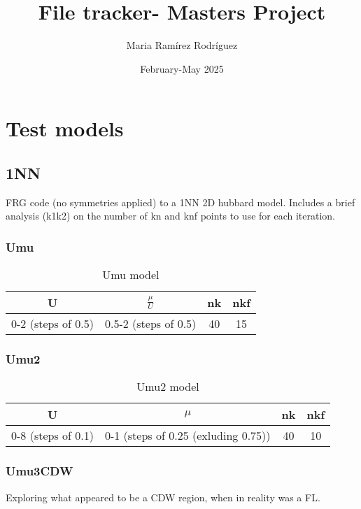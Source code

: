 \documentclass{article}
\title{File tracker- Masters Project}
\author{Maria Ramírez Rodríguez}
\date{February-May 2025}
\begin{document}
\maketitle



\section{Test models}

\subsection{1NN}
FRG code (no symmetries applied) to a 1NN 2D hubbard model. Includes  a brief analysis (k1k2)  on the number of kn and knf points to use for each iteration. 

\subsubsection{Umu}


\begin{table}[h]
    \centering
    \begin{tabular}{|c|c|c|c|}
        \hline
        U & $\frac{\mu}{U}$ &  nk & nkf\\ \hline
        0-2 (steps of 0.5)  &  0.5-2 (steps of 0.5)  & 40   & 15   \\ \hline
    \end{tabular}
    \caption{Umu model}
    \label{tab:example_table}
\end{table}




\subsubsection{Umu2}
\begin{table}[h]
    \centering
    \begin{tabular}{|c|c|c|c|}
        \hline
        U & $\mu$ &  nk & nkf\\ \hline
        0-8 (steps of 0.1)  &  0-1 (steps of 0.25 (exluding 0.75))  & 40   & 10   \\ \hline
    \end{tabular}
    \caption{Umu2 model}
    \label{tab:example_table}
\end{table}


\subsubsection{Umu3CDW}
Exploring what appeared to be a CDW region, when in reality was a FL. 
\end{document}
